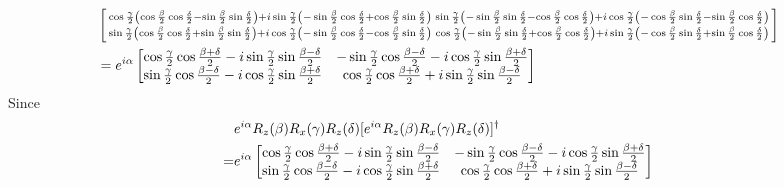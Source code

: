 \documentclass[en]{sol-man}
\begin{document}
\begin{sol}
\begin{align}
        \notag&\left[\begin{smallmatrix}
            \cos\frac{\gamma}{2}\left(\cos\frac{\beta}{2}\cos\frac{\delta}{2}-\sin\frac{\beta}{2}\sin\frac{\delta}{2}\right)+i\sin\frac{\gamma}{2}\left(-\sin\frac{\beta}{2}\cos\frac{\delta}{2}+\cos\frac{\beta}{2}\sin\frac{\delta}{2}\right)&\sin\frac{\gamma}{2}\left(-\sin\frac{\beta}{2}\sin\frac{\delta}{2}-\cos\frac{\beta}{2}\cos\frac{\delta}{2}\right)+i\cos\frac{\gamma}{2}\left(-\cos\frac{\beta}{2}\sin\frac{\delta}{2}-\sin\frac{\beta}{2}\cos\frac{\delta}{2}\right)\\
            \sin\frac{\gamma}{2}\left(\cos\frac{\beta}{2}\cos\frac{\delta}{2}+\sin\frac{\beta}{2}\sin\frac{\delta}{2}\right)+i\cos\frac{\gamma}{2}\left(-\sin\frac{\beta}{2}\cos\frac{\delta}{2}-\cos\frac{\beta}{2}\sin\frac{\delta}{2}\right)&\cos\frac{\gamma}{2}\left(-\sin\frac{\beta}{2}\sin\frac{\delta}{2}+\cos\frac{\beta}{2}\cos\frac{\delta}{2}\right)+i\sin\frac{\gamma}{2}\left(-\cos\frac{\beta}{2}\sin\frac{\delta}{2}+\sin\frac{\beta}{2}\cos\frac{\delta}{2}\right)
        \end{smallmatrix}\right]\\
        \notag&=e^{i\alpha}\begin{bmatrix}
            \cos\frac{\gamma}{2}\cos\frac{\beta+\delta}{2}-i\sin\frac{\gamma}{2}\sin\frac{\beta-\delta}{2}&-\sin\frac{\gamma}{2}\cos\frac{\beta-\delta}{2}-i\cos\frac{\gamma}{2}\sin\frac{\beta+\delta}{2}\\
            \sin\frac{\gamma}{2}\cos\frac{\beta-\delta}{2}-i\cos\frac{\gamma}{2}\sin\frac{\beta+\delta}{2}&\cos\frac{\gamma}{2}\cos\frac{\beta+\delta}{2}+i\sin\frac{\gamma}{2}\sin\frac{\beta-\delta}{2}
        \end{bmatrix}\\
    \end{align}
    Since
    \begin{align}
        \notag&e^{i\alpha}R_z(\beta)R_x(\gamma)R_z(\delta)[e^{i\alpha}R_z(\beta)R_x(\gamma)R_z(\delta)]^{\dagger}\\
        \notag=&e^{i\alpha}\begin{bmatrix}
            \cos\frac{\gamma}{2}\cos\frac{\beta+\delta}{2}-i\sin\frac{\gamma}{2}\sin\frac{\beta-\delta}{2}&-\sin\frac{\gamma}{2}\cos\frac{\beta-\delta}{2}-i\cos\frac{\gamma}{2}\sin\frac{\beta+\delta}{2}\\
            \sin\frac{\gamma}{2}\cos\frac{\beta-\delta}{2}-i\cos\frac{\gamma}{2}\sin\frac{\beta+\delta}{2}&\cos\frac{\gamma}{2}\cos\frac{\beta+\delta}{2}+i\sin\frac{\gamma}{2}\sin\frac{\beta-\delta}{2}

\end{bmatrix}
\end{align}
\end{sol}
\end{document}
